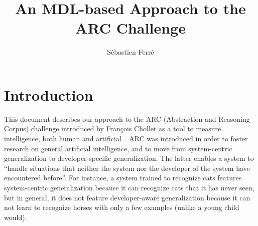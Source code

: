 \documentclass[a4paper]{llncs}
\newcommand{\HIDE}[1]{}
\begin{document}
\title{An MDL-based Approach to the ARC Challenge}

\author{Sébastien Ferré}


\maketitle

\begin{abstract}
\end{abstract}

\HIDE{
Measure of Intelligence
Artificial Intelligence
Explainable AI
Program Synthesis
Structured Prediction
Minimum Description Length
2D Parsing
}

\sloppy

\section{Introduction}
\label{intro}

This document describes our approach to the ARC (Abstraction and
Reasoning Corpus) challenge introduced by François Chollet as a tool
to measure intelligence, both human and artificial~\cite{Chollet2019}.
ARC was introduced in order to foster research on general artificial
intelligence, and to move from system-centric generalization to
developer-specific generalization. The latter enables a system to
``handle situations that neither the system nor the developer of the
system have encountered before''. For instance, a system trained to
recognize cats features system-centric generalization because it can
recognize cats that it has never seen, but in general, it does not
feature developer-aware generalization because it can not learn to
recognize horses with only a few examples (unlike a young child
would).
\end{document}
